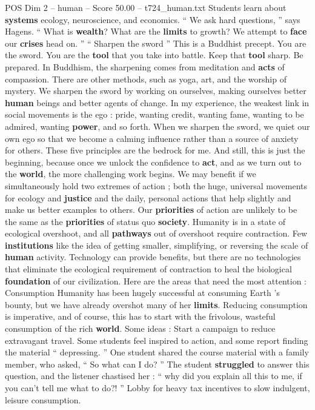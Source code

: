 \begin{textsample}{POS Dim 2 – human – Score 50.00 – t724\_human.txt}
Students learn about \textbf{systems} ecology, neuroscience, and economics. “ We ask hard questions, ” says Hagens. “ What is \textbf{wealth}?
What are the \textbf{limits} to growth?
We attempt to \textbf{face} our \textbf{crises} head on. ” “ Sharpen the sword ” This is a Buddhist precept.
You are the sword.
You are the \textbf{tool} that you take into battle.
Keep that \textbf{tool} sharp.
Be prepared.
In Buddhism, the sharpening comes from meditation and \textbf{acts} of compassion.
There are other methods, such as yoga, art, and the worship of mystery.
We sharpen the sword by working on ourselves, making ourselves better \textbf{human} beings and better agents of change.
In my experience, the weakest link in social movements is the ego : pride, wanting credit, wanting fame, wanting to be admired, wanting \textbf{power}, and so forth.
When we sharpen the sword, we quiet our own ego so that we become a calming influence rather than a source of anxiety for others.
These five principles are the bedrock for me.
And still, this is just the beginning, because once we unlock the confidence to \textbf{act}, and as we turn out to the \textbf{world}, the more challenging work begins.
We may benefit if we simultaneously hold two extremes of action ; both the huge, universal movements for ecology and \textbf{justice} and the daily, personal actions that help slightly and make us better examples to others.
Our \textbf{priorities} of action are unlikely to be the same as the \textbf{priorities} of status quo \textbf{society}.
Humanity is in a state of ecological overshoot, and all \textbf{pathways} out of overshoot require contraction.
Few \textbf{institutions} like the idea of getting smaller, simplifying, or reversing the scale of \textbf{human} activity.
Technology can provide benefits, but there are no technologies that eliminate the ecological requirement of contraction to heal the biological \textbf{foundation} of our civilization.
Here are the areas that need the most attention : Consumption Humanity has been hugely successful at consuming Earth ’s bounty, but we have already overshot many of her \textbf{limits}.
Reducing consumption is imperative, and of course, this has to start with the frivolous, wasteful consumption of the rich \textbf{world}.
Some ideas : Start a campaign to reduce extravagant travel.
Some students feel inspired to action, and some report finding the material “ depressing. ” One student shared the course material with a family member, who asked, “ So what can I do? ” The student \textbf{struggled} to answer this question, and the listener chastised her : “ why did you explain all this to me, if you can't tell me what to do?! ” Lobby for heavy tax incentives to slow indulgent, leisure consumption.

\end{textsample}
